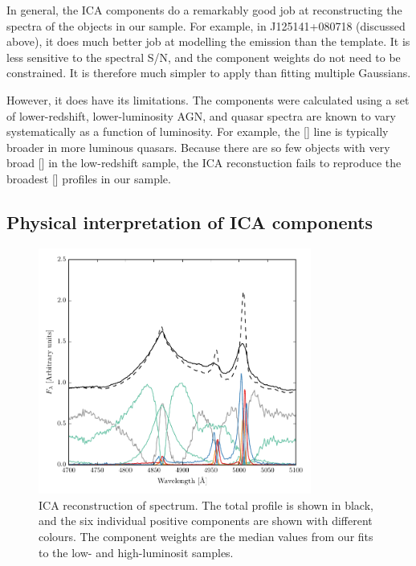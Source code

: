 In general, the ICA components do a remarkably good job at reconstructing the spectra of the objects in our sample. 
For example, in J125141+080718 (discussed above), it does much better job at modelling the  emission than the \citet{boroson92} template. 
It is less sensitive to the spectral S/N, and the component weights do not need to be constrained. 
It is therefore much simpler to apply than fitting multiple Gaussians. 

However, it does have its limitations. 
The components were calculated using a set of lower-redshift, lower-luminosity AGN, and quasar spectra are known to vary systematically as a function of luminosity. 
For example, the [] line is typically broader in more luminous quasars. 
Because there are so few objects with very broad [] in the low-redshift sample, the ICA reconstuction fails to reproduce the broadest [] profiles in our sample. 

\subsection{Physical interpretation of ICA components}

\begin{figure}
    \centering
    \includegraphics[width=0.8\textwidth]{figures/chapter04/mfica_components.pdf} 
    \caption{ICA reconstruction of spectrum. The total profile is shown in black, and the six individual positive components are shown with different colours. The component weights are the median values from our fits to the low- and high-luminosit samples.}     
    \label{fig:mfica_components}
\end{figure}

